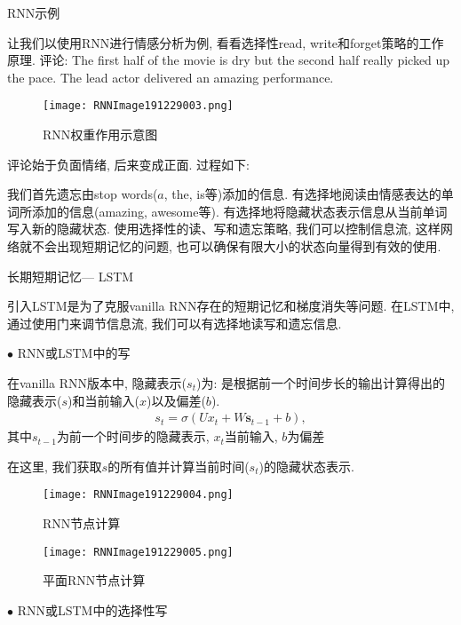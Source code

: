 \begin{example}RNN示例

让我们以使用RNN进行情感分析为例, 看看选择性read, write和forget策略的工作原理.
评论: The first half of the movie is dry but the second half really picked up the pace. The lead actor delivered an amazing performance.
\begin{figure}[H]
\centering
\texttt{[image: RNNImage191229003.png]}
\caption{RNN权重作用示意图}
\label{RNNImage191229003}
\end{figure}
评论始于负面情绪, 后来变成正面. 过程如下:

我们首先遗忘由stop words($a$, the, is等)添加的信息. 有选择地阅读由情感表达的单词所添加的信息(amazing, awesome等). 有选择地将隐藏状态表示信息从当前单词写入新的隐藏状态.
使用选择性的读、写和遗忘策略, 我们可以控制信息流, 这样网络就不会出现短期记忆的问题, 也可以确保有限大小的状态向量得到有效的使用.

长期短期记忆— LSTM

引入LSTM是为了克服vanilla RNN存在的短期记忆和梯度消失等问题. 在LSTM中, 通过使用门来调节信息流, 我们可以有选择地读写和遗忘信息.

$\bullet$ RNN或LSTM中的写

在vanilla RNN版本中, 隐藏表示($s_t$)为: 是根据前一个时间步长的输出计算得出的隐藏表示($s$)和当前输入($x$)以及偏差($b$).
\begin{align}
  s_{t}=\sigma\left(U x_{t}+W \mathbf{s}_{t-1}+b\right),
\end{align}
其中$s_{t-1}$为前一个时间步的隐藏表示, $x_t$当前输入, $b$为偏差

在这里, 我们获取$s$的所有值并计算当前时间($s_t$)的隐藏状态表示.
\begin{figure}[H]
\centering
\texttt{[image: RNNImage191229004.png]}
\caption{RNN节点计算}
\label{RNNImage191229004}
\end{figure}
\begin{figure}[H]
\centering
\texttt{[image: RNNImage191229005.png]}
\caption{平面RNN节点计算}
\label{RNNImage191229005}
\end{figure}

$\bullet$ RNN或LSTM中的选择性写


\end{example}
